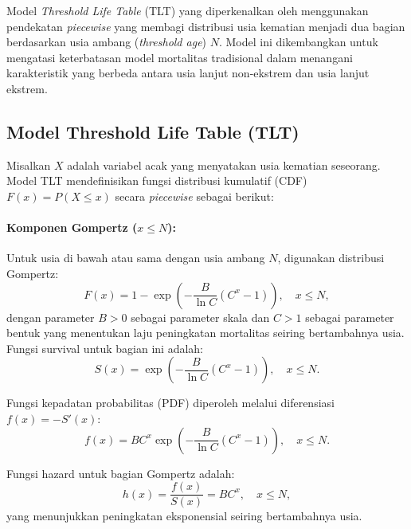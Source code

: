 Model \textit{Threshold Life Table} (TLT) yang diperkenalkan oleh \citet{li2008threshold} menggunakan pendekatan \textit{piecewise} yang membagi distribusi usia kematian menjadi dua bagian berdasarkan usia ambang (\textit{threshold age}) $N$. Model ini dikembangkan untuk mengatasi keterbatasan model mortalitas tradisional dalam menangani karakteristik yang berbeda antara usia lanjut non-ekstrem dan usia lanjut ekstrem.

\subsection{Model Threshold Life Table (TLT)}

Misalkan $X$ adalah variabel acak yang menyatakan usia kematian seseorang. Model TLT mendefinisikan fungsi distribusi kumulatif (CDF) $F(x) = P(X \leq x)$ secara \textit{piecewise} sebagai berikut:

\paragraph{Komponen Gompertz ($x \leq N$):}
Untuk usia di bawah atau sama dengan usia ambang $N$, digunakan distribusi Gompertz:
\begin{equation}
F(x) = 1 - \exp\left(-\frac{B}{\ln C}(C^x - 1)\right), \quad x \leq N,
\label{eq:tlt_gompertz_cdf}
\end{equation}
dengan parameter $B > 0$ sebagai parameter skala dan $C > 1$ sebagai parameter bentuk yang menentukan laju peningkatan mortalitas seiring bertambahnya usia. Fungsi survival untuk bagian ini adalah:
\begin{equation}
S(x) = \exp\left(-\frac{B}{\ln C}(C^x - 1)\right), \quad x \leq N.
\label{eq:tlt_gompertz_survival}
\end{equation}

Fungsi kepadatan probabilitas (PDF) diperoleh melalui diferensiasi $f(x) = -S'(x)$:
\begin{equation}
f(x) = BC^x \exp\left(-\frac{B}{\ln C}(C^x - 1)\right), \quad x \leq N.
\label{eq:tlt_gompertz_pdf}
\end{equation}

Fungsi hazard untuk bagian Gompertz adalah:
\begin{equation}
h(x) = \frac{f(x)}{S(x)} = BC^x, \quad x \leq N,
\label{eq:tlt_gompertz_hazard}
\end{equation}
yang menunjukkan peningkatan eksponensial seiring bertambahnya usia.

